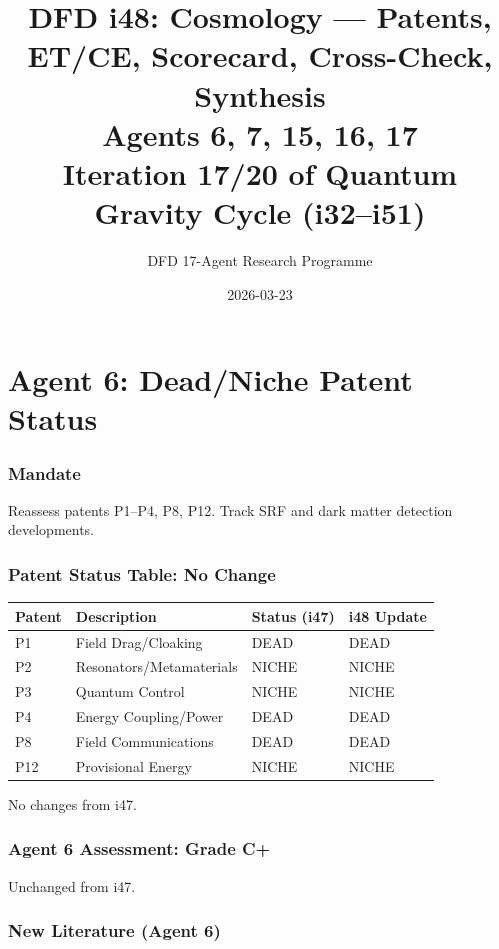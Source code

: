 \documentclass[11pt,a4paper]{article}
\title{DFD i48: Cosmology --- Patents, ET/CE, Scorecard, Cross-Check, Synthesis\\[6pt]
\large Agents 6, 7, 15, 16, 17\\[6pt]
\normalsize Iteration 17/20 of Quantum Gravity Cycle (i32--i51)}
\author{DFD 17-Agent Research Programme}
\date{2026-03-23}
\begin{document}
\maketitle
\tableofcontents
\newpage

\part{Agent 6: Dead/Niche Patent Status}
\label{part:agent6}

\section{Mandate}

Reassess patents P1--P4, P8, P12. Track SRF and dark matter detection developments.

\section{Patent Status Table: No Change}

\begin{center}
\begin{tabular}{llll}
\toprule
\textbf{Patent} & \textbf{Description} & \textbf{Status (i47)} & \textbf{i48 Update} \\
\midrule
P1 & Field Drag/Cloaking & DEAD & DEAD \\
P2 & Resonators/Metamaterials & NICHE & NICHE \\
P3 & Quantum Control & NICHE & NICHE \\
P4 & Energy Coupling/Power & DEAD & DEAD \\
P8 & Field Communications & DEAD & DEAD \\
P12 & Provisional Energy & NICHE & NICHE \\
\bottomrule
\end{tabular}
\end{center}

No changes from i47.

\section{Agent 6 Assessment: Grade C+}

Unchanged from i47.

\section{New Literature (Agent 6)}
\end{document}
